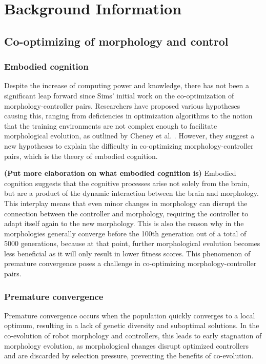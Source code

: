\section{Background Information}

\subsection{Co-optimizing of morphology and control}
    \subsubsection{Embodied cognition}
        Despite the increase of computing power and knowledge, there has not been a significant leap forward since Sims' initial work on the co-optimization of morphology-controller pairs. Researchers have proposed various hypotheses causing this, ranging from deficiencies in optimization algorithms to the notion that the training environments are not complex enough to facilitate morphological evolution, as outlined by Cheney et al. \cite{Cheney_2016}. However, they suggest a new hypotheses to explain the difficulty in co-optimizing morphology-controller pairs, which is the theory of embodied cognition. 

        \textbf{(Put more elaboration on what embodied cognition is)} Embodied cognition suggests that the cognitive processes arise not solely from the brain, but are a product of the dynamic interaction between the brain and morphology. This interplay means that even minor changes in morphology can disrupt the connection between the controller and morphology, requiring the controller to adapt itself again to the new morphology. This is also the reason why in \cite{Cheney_2016} the morphologies generally converge before the 100th generation out of a total of 5000 generations, because at that point, further morphological evolution becomes less beneficial as it will only result in lower fitness scores. This phenomenon of premature convergence poses a challenge in co-optimizing morphology-controller pairs.
 
    \subsubsection{Premature convergence}
        Premature convergence occurs when the population quickly converges to a local optimum, resulting in a lack of genetic diversity and suboptimal solutions. In the co-evolution of robot morphology and controllers, this leads to early stagnation of morphology evolution, as morphological changes disrupt optimized controllers and are discarded by selection pressure, preventing the benefits of co-evolution. \cite{Luis_2024}
        
